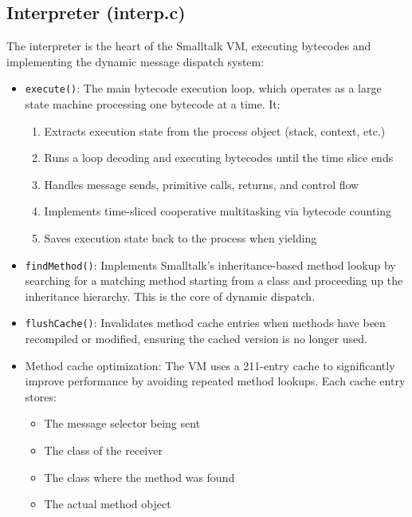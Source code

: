 \documentclass[12pt,a4paper]{report}
\begin{document}
\subsection{Interpreter (interp.c)}
The interpreter is the heart of the Smalltalk VM, executing bytecodes and implementing the dynamic message dispatch system:

\begin{itemize}
    \item \texttt{execute()}: The main bytecode execution loop, which operates as a large state machine processing one bytecode at a time. It:
    \begin{enumerate}
        \item Extracts execution state from the process object (stack, context, etc.)
        \item Runs a loop decoding and executing bytecodes until the time slice ends
        \item Handles message sends, primitive calls, returns, and control flow
        \item Implements time-sliced cooperative multitasking via bytecode counting
        \item Saves execution state back to the process when yielding
    \end{enumerate}

    \item \texttt{findMethod()}: Implements Smalltalk's inheritance-based method lookup by searching for a matching method starting from a class and proceeding up the inheritance hierarchy. This is the core of dynamic dispatch.

    \item \texttt{flushCache()}: Invalidates method cache entries when methods have been recompiled or modified, ensuring the cached version is no longer used.

    \item Method cache optimization: The VM uses a 211-entry cache to significantly improve performance by avoiding repeated method lookups. Each cache entry stores:
    \begin{itemize}
        \item The message selector being sent
        \item The class of the receiver
        \item The class where the method was found
        \item The actual method object
    \end{itemize}
\end{itemize}
\end{document}
